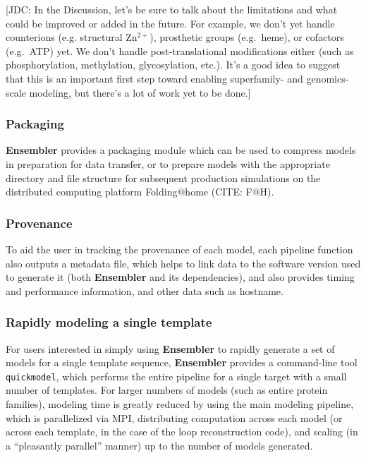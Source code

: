 \documentclass[aps,pre,twocolumn,nofootinbib,superscriptaddress,linenumbers]{revtex4-1}
\begin{document}
{\color{red}[JDC: In the Discussion, let's be sure to talk about the limitations and what could be improved or added in the future.  For example, we don't yet handle counterions (e.g. structural Zn$^{2+}$), prosthetic groups (e.g.~heme), or cofactors (e.g.~ATP) yet.  We don't handle post-translational modifications either (such as phosphorylation, methylation, glycosylation, etc.).  It's a good idea to suggest that this is an important first step toward enabling superfamily- and genomics-scale modeling, but there's a lot of work yet to be done.]}

\subsubsection{Packaging}

{\bf Ensembler} provides a packaging module which can be used to compress models in preparation for data transfer, or to prepare models with the appropriate directory and file structure for subsequent production simulations on the distributed computing platform Folding@home (CITE: F@H).

\subsubsection{Provenance}

To aid the user in tracking the provenance of each model, each pipeline function also outputs a metadata file, which helps to link data to the software version used to generate it (both {\bf Ensembler} and its dependencies), and also provides timing and performance information, and other data such as hostname.

\subsubsection{Rapidly modeling a single template}

For users interested in simply using {\bf Ensembler} to rapidly generate a set of models for a single template sequence, {\bf Ensembler} provides a command-line tool {\tt quickmodel}, which performs the entire pipeline for a single target with a small number of templates.
For larger numbers of models (such as entire protein families), modeling time is greatly reduced by using the main modeling pipeline, which is parallelized via MPI, distributing computation across each model (or across each template, in the case of the loop reconstruction code), and scaling (in a ``pleasantly parallel'' manner) up to the number of models generated.
\end{document}
